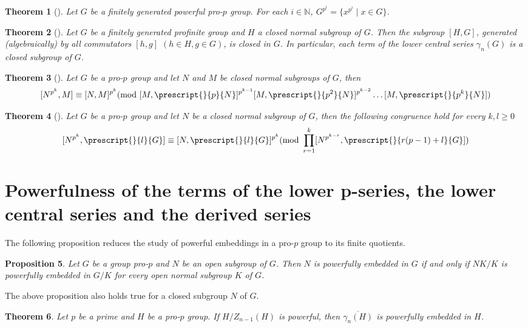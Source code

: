 \documentclass[12pt]{elsarticle}
\newtheorem{theorem}{Theorem}[section]
\newtheorem*{main corollary*}{Main Corollary}
\newtheorem{prop}[theorem]{Proposition}
\theoremstyle{definition}
\begin{document}
\begin{theorem}[{\cite[Theorem 3.6\textit{(iii)}]{DDMS99}}] \label{MannLubotzky_powerfully_embeddedforpropgroups}
    Let $G$ be a finitely generated powerful pro-$p$ group. For each $i \in \mathbb{N}$, $G^{p^i}=\{x^{p^i} \mid x \in G\}$.
\end{theorem}


 \begin{theorem} [{\cite[Theorem 1.4]{NS2007}}]\label{NikSeg2007}
     Let $G$ be a finitely generated profinite group and $H$ a closed normal subgroup of $G$. Then the subgroup $[H,G]$, generated (algebraically) by all commutators $[h,g]$ $(h \in H, g \in G)$, is closed in $G$. In particular, each term of the lower central series $\gamma_n(G)$ is a closed subgroup of $G$.
 \end{theorem}



 \begin{theorem}[{\cite[Theorem 2.4]{AlSaAn2008}}]\label{PR:T:1} 
 Let $G$ be a pro-$p$ group and let $N$ and $M$ be closed normal subgroups of $G$, then \[[N^{p^k},M] \equiv [N,M]^{p^k} (\text{mod } [M,\prescript{}{p}{N}]^{p^{k-1}} [M,\prescript{}{p^2}{N}]^{p^{k-2}} \ldots [M,\prescript{}{p^k}{N}])\]
 \end{theorem}

  \begin{theorem}[{\cite[Theorem 2.5]{AlSaAn2008}}]\label{PR:T:2} 
 Let $G$ be a pro-$p$ group and let $N$ be a closed normal subgroup of $G$, then the following congruence hold for every $k,l \geq 0$ \[[N^{p^k},\prescript{}{l}{G}] \equiv [N,\prescript{}{l}{G}]^{p^k} (\text{mod } \prod_{r=1}^k [N^{p^{k-r}},\prescript{}{r(p-1)+l}{G}])\]
 \end{theorem}



\section{Powerfulness of the terms of the lower p-series, the lower central series and the derived series} \label{section: powerful lower p, lower central, derived}
The following proposition reduces the study of powerful embeddings in a pro-$p$ group to its finite quotients.
\begin{prop} {\cite[Proposition 3.2]{DDMS99}}\label{Dixon_Profinite_to_finite}
    Let $G$ be a group pro-$p$ and $N$ be an open subgroup of $G$. Then $N$ is powerfully embedded in $G$
if and only if $NK/K$ is powerfully embedded in $G/K$ for every open normal subgroup $K$ of $G$.
\end{prop}
The above proposition also holds true for a closed subgroup $N$ of $G$.
\begin{theorem} \label{gamma_npowerful}
    Let $p$ be a prime and $H$ be a pro-$p$ group. If $H/Z_{n-1}(H)$ is powerful, then $\overline{\gamma_n(H)}$ is powerfully embedded in $H$.
\end{theorem}
\end{document}
